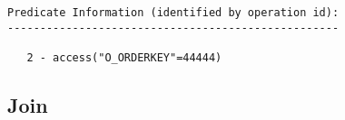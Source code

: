 \documentclass[11pt,a4paper,parskip=half]{scrartcl}
\begin{document}
\begin{lstlisting}
Predicate Information (identified by operation id):                                                                                                                                                                                                                                                          
---------------------------------------------------                                                                                                                                                                                                                                                          
                                                                                                                                                                                                                                                                                                             
   2 - access("O_ORDERKEY"=44444)    
\end{lstlisting}

\subsection{Join}
\end{document}
